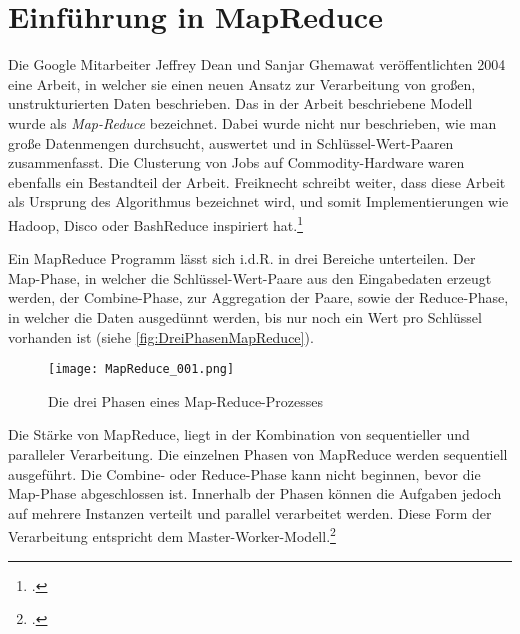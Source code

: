 

\section{Einführung in MapReduce}\label{sec:EinführungInMapReduce}
Die Google Mitarbeiter Jeffrey Dean und Sanjar Ghemawat veröffentlichten 2004 eine Arbeit, in welcher sie einen neuen Ansatz zur Verarbeitung von großen, unstrukturierten Daten beschrieben. Das in der Arbeit beschriebene Modell wurde als \textit{Map-Reduce} bezeichnet. Dabei wurde nicht nur beschrieben, wie man große Datenmengen durchsucht, auswertet und in Schlüssel-Wert-Paaren zusammenfasst. Die Clusterung von Jobs auf \gls{Commodity-Hardware} waren ebenfalls ein Bestandteil der Arbeit. Freiknecht schreibt weiter, dass diese Arbeit als Ursprung des Algorithmus bezeichnet wird, und somit Implementierungen wie Hadoop, Disco oder BashReduce inspiriert hat.\footcite[Vgl.][S. 42]{Freiknecht.2014}

Ein MapReduce Programm lässt sich i.d.R. in drei Bereiche unterteilen. Der Map-Phase, in welcher die Schlüssel-Wert-Paare aus den Eingabedaten erzeugt werden, der Combine-Phase, zur Aggregation der Paare, sowie der Reduce-Phase, in welcher die Daten ausgedünnt werden, bis nur noch ein Wert pro Schlüssel vorhanden ist (siehe \autoref{fig:DreiPhasenMapReduce}).

\begin{figure}[h]
	\centering
	\texttt{[image: MapReduce\_001.png]}
	\caption{Die drei Phasen eines Map-Reduce-Prozesses\footnotemark}
	\label{fig:DreiPhasenMapReduce}
\end{figure}

Die Stärke von MapReduce, liegt in der Kombination von sequentieller und paralleler Verarbeitung. Die einzelnen Phasen von MapReduce werden sequentiell ausgeführt. Die Combine- oder Reduce-Phase kann nicht beginnen, bevor die Map-Phase abgeschlossen ist. Innerhalb der Phasen können die Aufgaben jedoch auf mehrere Instanzen verteilt und parallel verarbeitet werden. Diese Form der Verarbeitung entspricht dem Master-Worker-Modell.\footcite[Vgl.][S.1 f]{Karloff.2010}

